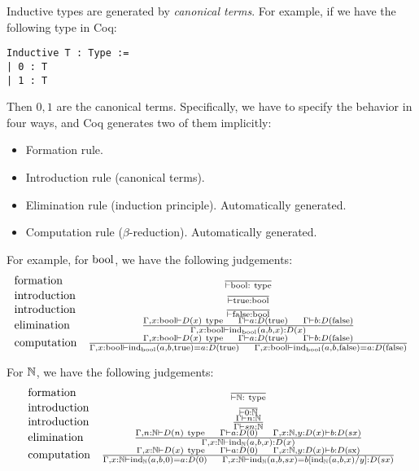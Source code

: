 Inductive types are generated by \emph{canonical terms}. For example, if we have the following type in Coq:
\begin{lstlisting}
Inductive T : Type :=
| 0 : T
| 1 : T
\end{lstlisting}
Then $0, 1$ are the canonical terms.
Specifically, we have to specify the behavior in four ways, and Coq generates two of them implicitly:
\begin{itemize}
\item Formation rule.
\item Introduction rule (canonical terms).
\item Elimination rule (induction principle). Automatically generated.
\item Computation rule ($\beta$-reduction). Automatically generated.
\end{itemize}

For example, for $\mathrm{bool}$, we have the following judgements:
\[
\begin{array}{lc}
\text{formation} & \frac{}{\vdash \mathrm{bool} : ~\mathrm{type}} \\
\text{introduction} &\frac{}{\vdash \mathrm{true} : \mathrm{bool}} \\
\text{introduction} & \frac{}{\vdash \mathrm{false} : \mathrm{bool}} \\
\text{elimination} & \frac{\Gamma, x : \mathrm{bool} \vdash D(x) ~\mathrm{type}~~~~\Gamma \vdash a : D(\mathrm{true})~~~~\Gamma \vdash
b : D(\mathrm{false})}{\Gamma, x : \mathrm{bool} \vdash \mathrm{ind}_{\mathrm{bool}} (a, b, x) : D(x)} \\
\text{computation} & \frac{\Gamma, x : \mathrm{bool} \vdash D(x) ~\mathrm{type}~~~~\Gamma \vdash a : D(\mathrm{true})~~~~\Gamma \vdash
b : D(\mathrm{false})}{\Gamma, x : \mathrm{bool} \vdash \mathrm{ind}_{\mathrm{bool}} (a, b, \mathrm{true}) = a : D(\mathrm{true})~~~~
\Gamma, x : \mathrm{bool} \vdash \mathrm{ind}_{\mathrm{bool}} (a, b, \mathrm{false}) = a : D(\mathrm{false})}
\end{array}
\]

\noindent For $\mathbb{N}$, we have the following judgements:
\[
\begin{array}{lc}
\text{formation} & \frac{}{\vdash \mathbb{N} : ~\mathrm{type}} \\
\text{introduction} &\frac{}{\vdash 0 : \mathbb{N}} \\
\text{introduction} & \frac{\Gamma \vdash n : \mathbb{N}}{\Gamma \vdash sn : \mathbb{N}} \\

\text{elimination} & \frac{\Gamma, n : \mathbb{N} \vdash D(n) ~\mathrm{type}~~~~
\Gamma \vdash a : D(\mathrm{0})~~~~
\Gamma, x : \mathbb{N}, y : D(x)\vdash
b : D(sx)}{\Gamma, x : \mathbb{N} \vdash \mathrm{ind}_{\mathbb{N}} (a, b, x) : D(x)} \\

\text{computation} & \frac{\Gamma, x : \mathbb{N} \vdash D(x) ~\mathrm{type}~~~~
\Gamma \vdash a : D(0)~~~~
\Gamma, x : \mathbb{N}, y : D(x) \vdash b : D(\mathrm{sx})}
{\Gamma, x : \mathbb{N} \vdash \mathrm{ind}_{\mathbb{N}} (a, b, 0) = a : D(0)~~~~
\Gamma, x : \mathbb{N} \vdash \mathrm{ind}_{\mathbb{N}} (a, b, sx) = b[\mathrm{ind}_{\mathbb{N}} (a, b, x)/y] : D(sx)}
\end{array}
\]

